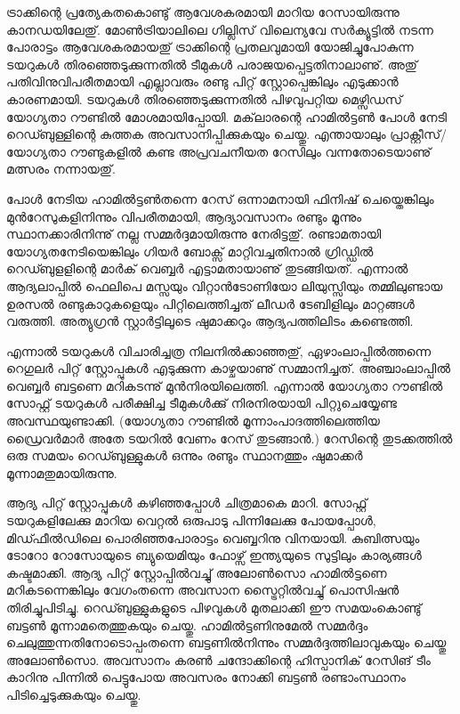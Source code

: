﻿
\vskip 2pt

ട്രാക്കിന്റെ പ്രത്യേകതകൊണ്ടു് ആവേശകരമായി മാറിയ റേസായിരുന്നു കാനഡയിലേതു്. മോണ്‍ട്രിയാലിലെ ഗില്ലിസ് 
വിലെന്യവേ സര്‍ക്യൂട്ടില്‍ നടന്ന പോരാട്ടം ആവേശകരമായതു് ട്രാക്കിന്റെ പ്രതലവുമായി യോജിച്ചുപോകുന്ന ടയറുകള്‍ 
തിരഞ്ഞെടുക്കുന്നതില്‍ ടീമുകള്‍ പരാജയപ്പെട്ടതിനാലാണു്. അതു് പതിവിനുവിപരീതമായി എല്ലാവരും രണ്ടു പിറ്റ് 
സ്റ്റോപ്പെങ്കിലും എടുക്കാന്‍ കാരണമായി. ടയറുകള്‍ തിരഞ്ഞെടുക്കുന്നതില്‍ പിഴവുപറ്റിയ മെഴ്സിഡസ് യോഗ്യതാ റൗണ്ടില്‍ 
മോ​ശമായിപ്പോയി. മക്‌ലാരന്റെ ഹാമില്‍ട്ടണ്‍ പോള്‍ നേടി റെഡ്ബുള്ളിന്റെ കുത്തക അവസാനിപ്പിക്കുകയും ചെയ്തു. 
എന്തായാലും പ്രാക്റ്റീസ്/യോഗ്യതാ റൗണ്ടുകളില്‍ കണ്ട അപ്രവചനീയത റേസിലും വന്നതോടെയാണു് മത്സരം നന്നായതു്.

പോള്‍ നേടിയ ഹാമില്‍ട്ടണ്‍തന്നെ റേസ് ഒന്നാമനായി ഫിനിഷ് ചെയ്തെങ്കിലും മുന്‍റേസുകളിനിന്നും വിപരീതമായി,
ആദ്യാവസാനം രണ്ടും മൂന്നും സ്ഥാനക്കാരിനിന്നു് നല്ല സമ്മര്‍ദ്ദമായിരുന്നു നേരിട്ടതു്. രണ്ടാമതായി യോഗ്യതനേടിയെങ്കിലും
ഗിയര്‍ ബോക്സ് മാറ്റിവച്ചതിനാല്‍ ഗ്രിഡ്ഡില്‍ റെഡ്ബുളളിന്റെ മാര്‍ക് വെബ്ബര്‍ എട്ടാമതായാണു് തുടങ്ങിയത്. എന്നാല്‍ 
ആദ്യലാപ്പില്‍ ഫെലിപെ മസ്സയും വിറ്റാന്‍ടോണിയോ ലിയുസ്സിയും തമ്മിലുണ്ടായ ഉരസല്‍ രണ്ടുകാറുകളെയും 
പിറ്റിലെത്തിച്ചത് ലീഡര്‍ ടേബിളിലും മാറ്റങ്ങള്‍ വരുത്തി. അത്യുഗ്രന്‍ സ്റ്റാര്‍ട്ടിലൂടെ ഷുമാക്കറും ആദ്യപത്തിലിടം കണ്ടെത്തി.

എന്നാല്‍ ടയറുകള്‍ വിചാരിച്ചത്ര നിലനില്‍ക്കാഞ്ഞതു്, ഏഴാംലാപ്പില്‍ത്തന്നെ റെഗുലര്‍ പിറ്റ് സ്റ്റോപ്പുകള്‍ എടുക്കുന്ന 
കാഴ്ചയാണു് സമ്മാനിച്ചത്. അഞ്ചാംലാപ്പില്‍ വെബ്ബര്‍ ബട്ടണെ മറികടന്നു് മുന്‍നിരയിലെത്തി. എന്നാല്‍ യോഗ്യതാ 
റൗണ്ടില്‍ സോഫ്റ്റ് ടയറുകള്‍ പരീക്ഷിച്ച ടീമുകള്‍ക്കു് നിരനിരയായി പിറ്റുചെയ്യേണ്ട അവസ്ഥയുണ്ടാക്കി. (യോഗ്യതാ 
റൗണ്ടില്‍ മൂന്നാംപാദത്തിലെത്തിയ ഡ്രൈവര്‍മാര്‍ അതേ ടയറില്‍ വേണം റേസ് തുടങ്ങാന്‍.) റേസിന്റെ തുടക്കത്തില്‍ 
ഒരു സമയം റെഡ്ബുള്ളുകള്‍ ഒന്നും രണ്ടും സ്ഥാനത്തും ഷുമാക്കര്‍ മൂന്നാമതുമായിരുന്നു.

ആദ്യ പിറ്റ് സ്റ്റോപ്പുകള്‍ കഴിഞ്ഞപ്പോള്‍ ചിത്രമാകെ മാറി. സോഫ്റ്റ് ടയറുകളിലേക്കു മാറിയ വെറ്റല്‍ ഒരുപാടു പിന്നിലേക്കു 
പോയപ്പോള്‍, മിഡ്ഫീല്‍ഡിലെ പൊരിഞ്ഞപോരാട്ടം വെബ്ബറിനു വിനയായി. കുബിത്സയും ടോറോ റോസോയുടെ 
ബ്യുയെമിയും ഫോഴ്സ് ഇന്ത്യയുടെ സുട്ടിലും കാര്യങ്ങള്‍ കഷ്ടമാക്കി. ആദ്യ പിറ്റ് സ്റ്റോപ്പില്‍വച്ചു് അലോണ്‍സൊ ഹാമില്‍ട്ടണെ
മറികടന്നെങ്കിലും വേഗംതന്നെ അവസാന സ്ട്രൈറ്റില്‍വച്ചു് പൊസിഷന്‍ തിരിച്ചുപിടിച്ചു. റെഡ്ബുള്ളുകളുടെ പിഴവുകള്‍ 
മുതലാക്കി ഈ സമയംകൊണ്ടു് ബട്ടണ്‍ മൂന്നാമതെത്തുകയും ചെയ്തു. ഹാമില്‍ട്ടണിനുമേല്‍ സമ്മര്‍ദ്ദം 
ചെലുത്തുന്നതിനോടൊപ്പംതന്നെ ബട്ടണില്‍നിന്നും സമ്മര്‍ദ്ദത്തിലാവുകയും ചെയ്തു അലോണ്‍സൊ. അവസാനം 
കരണ്‍ ചന്ദോക്കിന്റെ ഹിസ്പാനിക് റേസിങ് ടീം കാറിനു പിന്നില്‍ പെട്ടുപോയ അവസരം നോക്കി ബട്ടണ്‍ രണ്ടാംസ്ഥാനം 
പിടിച്ചെടുക്കുകയും ചെയ്തു.

